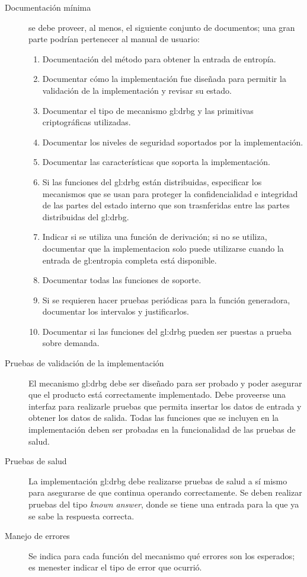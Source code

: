 \begin{description}
  \item[Documentación mínima] se debe proveer, al menos, el siguiente conjunto
    de documentos; una gran parte podrían pertenecer al manual de usuario:
    \begin{enumerate}
      \item Documentación del método para obtener la entrada de entropía.
      \item Documentar cómo la implementación fue diseñada para permitir la
        validación de la implementación y revisar su estado.
      \item Documentar el tipo de mecanismo \gls{gl:drbg} y las primitivas
        criptográficas utilizadas.
      \item Documentar los niveles de seguridad soportados por la
        implementación.
      \item Documentar las características que soporta la implementación.
      \item Si las funciones del \gls{gl:drbg} están distribuidas, especificar
        los mecanismos que se usan para proteger la confidencialidad e
        integridad de las partes del estado interno que son trasnferidas entre
        las partes distribuidas del \gls{gl:drbg}.
      \item Indicar si se utiliza una función de derivación; si no se utiliza,
        documentar que la implementacion solo puede utilizarse cuando la entrada
        de \gls{gl:entropia} completa está disponible.
      \item Documentar todas las funciones de soporte.
      \item Si se requieren hacer pruebas periódicas para la función generadora,
        documentar los intervalos y justificarlos.
      \item Documentar si las funciones del \gls{gl:drbg} pueden ser puestas a
        prueba sobre demanda.
    \end{enumerate}

  \item[Pruebas de validación de la implementación] El mecanismo \gls{gl:drbg}
    debe ser diseñado para ser probado y poder asegurar que el producto está
    correctamente implementado. Debe proveerse una interfaz para realizarle
    pruebas que permita insertar los datos de entrada y obtener los datos de
    salida. Todas las funciones que se incluyen en la implementación deben ser
    probadas en la funcionalidad de las pruebas de salud.

  \item[Pruebas de salud] La implementación \gls{gl:drbg} debe realizarse
    pruebas de salud a sí mismo para asegurarse de que continua operando
    correctamente. Se deben realizar pruebas del tipo \textit{known answer},
    donde se tiene una entrada para la que ya se sabe la respuesta correcta.

  \item[Manejo de errores] Se indica para cada función del mecanismo qué errores
    son los esperados; es menester indicar el tipo de error que ocurrió.

\end{description}
